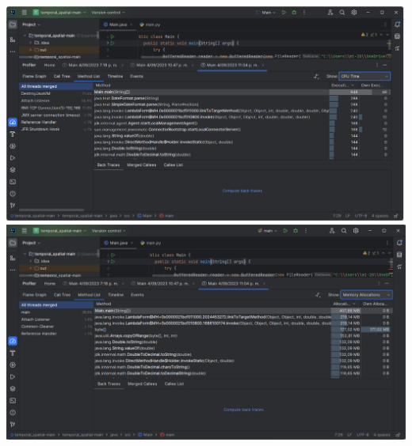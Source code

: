 \documentclass[a4paper,twocolumn,10pt]{article}
\begin{document}
\includegraphics[width=0.9\linewidth]{HP Ryzen 5500U/Method List CPU 2.png}
\includegraphics[width=0.9\linewidth]{HP Ryzen 5500U/Method List Memory Allocation 2.png}
\end{document}
